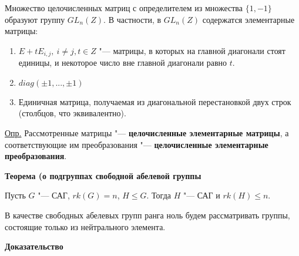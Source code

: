 \documentclass{article}
\begin{document}
Множество целочисленных матриц с определителем из множества $\{1, -1\}$ образуют группу $GL_n(Z)$. В частности, в $GL_n(Z)$ содержатся элементарные матрицы:
\begin{enumerate}
	\item $E + tE_{i,j}, \ i \neq j, t \in Z$ "--- матрицы, в которых на главной диагонали стоят единицы, и некоторое число вне главной диагонали равно $t$.
	\item $diag(\pm1, ... , \pm1)$
	\item Единичная матрица, получаемая из диагональной перестановкой двух строк (столбцов, что эквивалентно).
\end{enumerate}

\vspace{5pt}

\underline{Опр.} Рассмотренные матрицы "--- \textbf{целочисленные элементарные матрицы}, а соответствующие им преобразования "--- \textbf{целочисленные элементарные преобразования}.

\vspace{10pt}

\textbf{Теорема (о подгруппах свободной абелевой группы}

Пусть $G$ "--- САГ, $rk(G) = n$, $H \leq G$. Тогда $H$ "--- САГ и $rk(H) \leq n$.

В качестве свободных абелевых групп ранга ноль будем рассматривать группы, состоящие только из нейтрального элемента.

\textbf{Доказательство}
\end{document}
